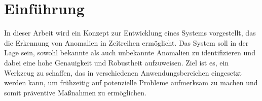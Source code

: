 
\section{Einführung}
\label{sec:Einfuehrung}

In dieser Arbeit wird ein Konzept zur Entwicklung eines Systems vorgestellt, das die Erkennung von Anomalien in Zeitreihen ermöglicht. Das System soll in der Lage sein, sowohl bekannte als auch unbekannte Anomalien zu identifizieren und dabei eine hohe Genauigkeit und Robustheit aufzuweisen. Ziel ist es, ein Werkzeug zu schaffen, das in verschiedenen Anwendungsbereichen eingesetzt werden kann, um frühzeitig auf potenzielle Probleme aufmerksam zu machen und somit präventive Maßnahmen zu ermöglichen. \autocite{Neumann2024Jan}
